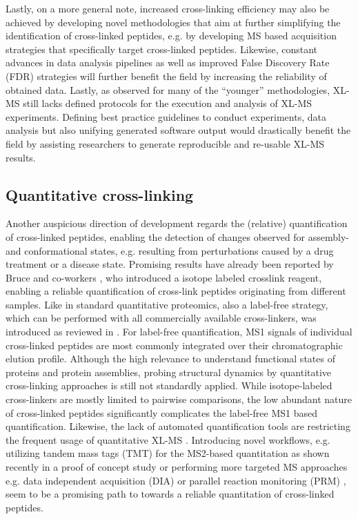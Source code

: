 Lastly, on a more general note, increased cross-linking efficiency may also be achieved by developing novel methodologies that aim at further simplifying the identification of cross-linked peptides, e.g. by developing MS based acquisition strategies that specifically target cross-linked peptides. Likewise, constant advances in data analysis pipelines as well as improved False Discovery Rate (FDR) strategies will further benefit the field by increasing the reliability of obtained data. Lastly, as observed for many of the “younger” methodologies, XL-MS still lacks defined protocols for the execution and analysis of XL-MS experiments. Defining best practice guidelines to conduct experiments, data analysis but also unifying generated software output would drastically benefit the field by assisting researchers to generate reproducible and re-usable XL-MS results.
%
\subsection*{Quantitative cross-linking}
Another auspicious direction of development regards the (relative) quantification of cross-linked peptides, enabling the detection of changes observed for assembly- and conformational states, e.g. resulting from perturbations caused by a drug treatment or a disease state. Promising results have already been reported by Bruce and co-workers \cite{RN25}, who introduced a isotope labeled crosslink reagent, enabling a reliable quantification of cross-link peptides originating from different samples. Like in standard quantitative proteomics, also a label-free strategy, which can be performed with all commercially available cross-linkers, was introduced as reviewed in \cite{RN26, RN27}. For label-free quantification, MS1 signals of individual cross-linked peptides are most commonly integrated over their chromatographic elution profile. Although the high relevance to understand functional states of proteins and protein assemblies, probing structural dynamics by quantitative cross-linking approaches is still not standardly applied. While isotope-labeled cross-linkers are mostly limited to pairwise comparisons, the low abundant nature of cross-linked peptides significantly complicates the label-free MS1 based quantification. Likewise, the lack of automated quantification tools are restricting the frequent usage of quantitative XL-MS \cite{RN27}. Introducing novel workflows, e.g. utilizing tandem mass tags (TMT) for the MS2-based quantitation as shown recently in a proof of concept study \cite{RN28} or performing more targeted MS approaches e.g. data independent acquisition (DIA) \cite{RN29} or parallel reaction monitoring (PRM) \cite{RN30}, seem to be a promising path to towards a reliable quantitation of cross-linked peptides.
%
